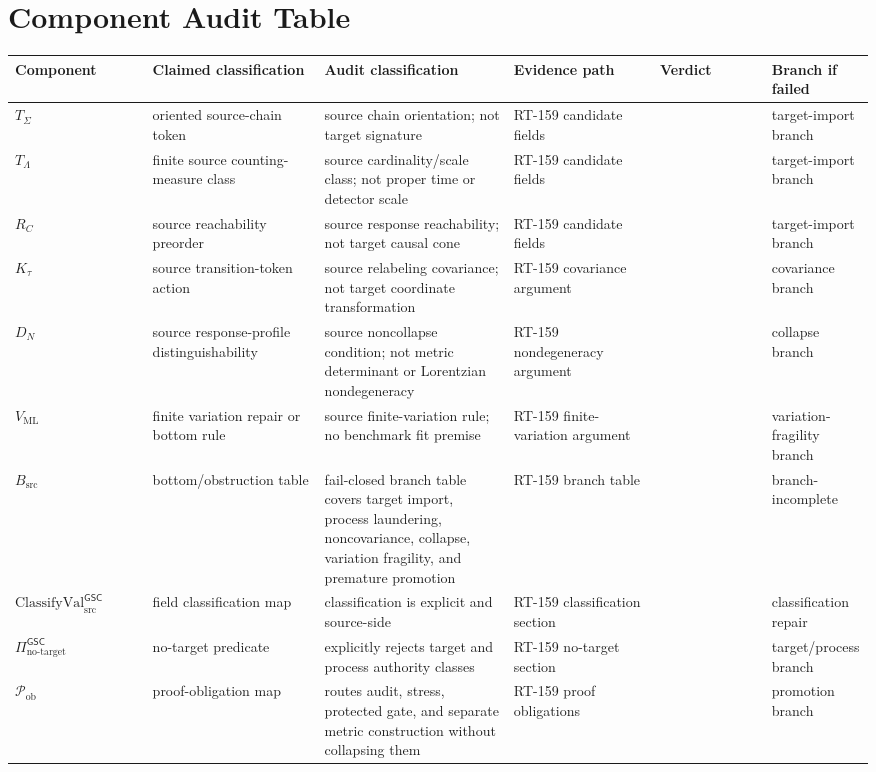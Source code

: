\documentclass[11pt]{article}
\newcommand{\Pass}{\mathrm{pass\_no\_smuggling\_detected}}
\begin{document}
\section{Component Audit Table}

\begin{longtable}{p{0.16\linewidth}p{0.20\linewidth}p{0.22\linewidth}p{0.17\linewidth}p{0.13\linewidth}p{0.12\linewidth}}
\toprule
Component & Claimed classification & Audit classification & Evidence path & Verdict & Branch if failed \\
\midrule
\(T_{\Sigma}\) &
oriented source-chain token &
source chain orientation; not target signature &
RT-159 candidate fields &
\Pass &
target-import branch \\
\(T_{\Lambda}\) &
finite source counting-measure class &
source cardinality/scale class; not proper time or detector scale &
RT-159 candidate fields &
\Pass &
target-import branch \\
\(R_C\) &
source reachability preorder &
source response reachability; not target causal cone &
RT-159 candidate fields &
\Pass &
target-import branch \\
\(K_{\tau}\) &
source transition-token action &
source relabeling covariance; not target coordinate transformation &
RT-159 covariance argument &
\Pass &
covariance branch \\
\(D_N\) &
source response-profile distinguishability &
source noncollapse condition; not metric determinant or Lorentzian
nondegeneracy &
RT-159 nondegeneracy argument &
\Pass &
collapse branch \\
\(V_{\mathrm{ML}}\) &
finite variation repair or bottom rule &
source finite-variation rule; no benchmark fit premise &
RT-159 finite-variation argument &
\Pass &
variation-fragility branch \\
\(B_{\mathrm{src}}\) &
bottom/obstruction table &
fail-closed branch table covers target import, process laundering,
noncovariance, collapse, variation fragility, and premature promotion &
RT-159 branch table &
\Pass &
branch-incomplete \\
\(\mathrm{ClassifyVal}_{\mathrm{src}}^{\mathsf{GSC}}\) &
field classification map &
classification is explicit and source-side &
RT-159 classification section &
\Pass &
classification repair \\
\(\Pi_{\mathrm{no\mbox{-}target}}^{\mathsf{GSC}}\) &
no-target predicate &
explicitly rejects target and process authority classes &
RT-159 no-target section &
\Pass &
target/process branch \\
\(\mathcal{P}_{\mathrm{ob}}\) &
proof-obligation map &
routes audit, stress, protected gate, and separate metric construction
without collapsing them &
RT-159 proof obligations &
\Pass &
promotion branch \\
\bottomrule
\end{longtable}
\end{document}
